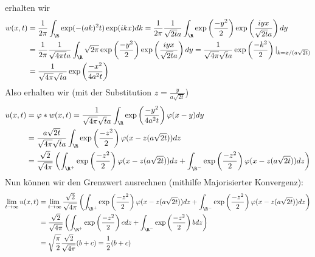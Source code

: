 \begin{solution}
erhalten wir
\begin{align*}
  w(x,t) &= \frac{1}{2\pi}\int_\R \exp(-(ak)^2t)\exp(ikx) dk
  = \frac{1}{2\pi}\frac{1}{\sqrt{2t}a}\int_\R \exp\left(\frac{-y^2}{2}\right)
  \exp\left(\frac{iyx}{\sqrt{2t}a}\right) dy \\
  &= \frac{1}{2\pi}\frac{1}{\sqrt{4\pi t}a}\int_\R \sqrt{2\pi}\exp\left(\frac{-y^2}{2}\right)
  \exp\left(\frac{iyx}{\sqrt{2t}a}\right) dy
  = \frac{1}{\sqrt{4\pi} \sqrt{t}a}\exp\left(\frac{-k^2}{2}\right)|_{k = x/(a \sqrt{2t})} \\
  &= \frac{1}{\sqrt{4\pi} \sqrt{t}a}\exp\left(\frac{-x^2}{4a^2 t}\right)
\end{align*}
Also erhalten wir (mit der Substitution $z = \frac{y}{a \sqrt{2t}}$)
\begin{align*}
  u(x,t) &= \varphi \ast w (x,t) =
  \frac{1}{\sqrt{4\pi} \sqrt{t}a} \int_\R \exp\left(\frac{-y^2}{4a^2 t}\right)\varphi(x-y) dy \\
  &= \frac{a \sqrt{2t}}{\sqrt{4\pi} \sqrt{t}a} \int_\R \exp\left(\frac{-z^2}{2}\right)\varphi(x-z(a \sqrt{2t})) dz \\
  &= \frac{\sqrt{2}}{\sqrt{4\pi}} \left(\int_{\R^{+}} \exp\left(\frac{-z^2}{2}\right)\varphi(x-z(a \sqrt{2t})) dz + \int_{\R^{-}} \exp\left(\frac{-z^2}{2}\right)\varphi(x-z(a \sqrt{2t})) dz \right)
\end{align*}
Nun können wir den Grenzwert ausrechnen (mithilfe Majorisierter Konvergenz):
\begin{align*}
  \lim_{t \to \infty} u(x,t) &= \lim_{t \to \infty}
  \frac{\sqrt{2}}{\sqrt{4\pi}} \left(\int_{\R^{+}} \exp\left(\frac{-z^2}{2}\right)\varphi(x-z(a \sqrt{2t})) dz + \int_{\R^{-}} \exp\left(\frac{-z^2}{2}\right)\varphi(x-z(a \sqrt{2t})) dz \right) \\
  &= \frac{\sqrt{2}}{\sqrt{4\pi}} \left(\int_{\R^{+}} \exp\left(\frac{-z^2}{2}\right)c dz + \int_{\R^{-}} \exp\left(\frac{-z^2}{2}\right)b dz \right) \\
  &= \sqrt{\frac{\pi}{2}} \frac{\sqrt{2}}{\sqrt{4\pi}} (b+c) = \frac{1}{2} (b+c)
\end{align*}
\end{solution}

